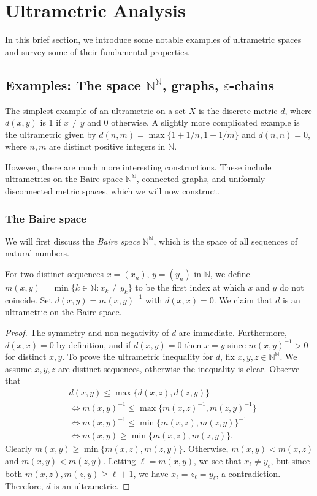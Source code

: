 \section{Ultrametric Analysis}
In this brief section, we introduce some notable examples of ultrametric spaces and survey some of their fundamental properties.
\subsection{Examples: The space \( \mathbb{N} ^{\mathbb{N} } \), graphs, \( \varepsilon \)-chains} The simplest example of an ultrametric on a set $X$ is the discrete metric $d$, where $d(x,y)$ is 1 if $x \neq y$ and 0 otherwise. A slightly more complicated example is the ultrametric given by \( d(n,m) = \max \{ 1 + 1/n , 1 + 1/m \} \) and \( d(n, n) = 0 \), where \( n , m  \) are distinct positive integers in \( \mathbb{N}  \).

However, there are much more interesting constructions. These include ultrametrics on the Baire space $\mathbb{N} ^{\mathbb{N} }$, connected graphs, and uniformly disconnected metric spaces, which we will now construct.

\subsubsection{The Baire space} We will first discuss the \emph{Baire space} \( \mathbb{N} ^{\mathbb{N} } \), which is the space of all sequences of natural numbers.

For two distinct sequences \( x = (x_{n}) \), \( y = (y_{n}) \) in \( \mathbb{N} \), we define \( m(x,y) = \min \{ k \in \mathbb{N} : x_{k} \neq y_{k} \} \) to be the first index at which \( x \) and \( y \) do not coincide. Set \( d(x,y) = m(x,y)^{-1} \) with \( d(x,x) = 0 \). We claim that \( d \) is an ultrametric on the Baire space.
\begin{proof}
The symmetry and non-negativity of \( d \) are immediate. Furthermore, \( d(x,x) = 0 \) by definition, and if \( d(x,y) = 0 \) then \( x = y \) since \( m(x,y)^{-1} > 0 \) for distinct \( x,y \). To prove the ultrametric inequality for \( d \), fix \( x,y,z \in \mathbb{N} ^{\mathbb{N} } \). We assume \( x,y,z \) are distinct sequences, otherwise the inequality is clear. Observe that
\begin{align*}
&d(x,y) \leq \max \{ d(x,z), d(z,y) \} \\
&\Leftrightarrow m(x,y)^{-1} \leq \max \{ m(x,z)^{-1} , m(z,y)^{-1} \} \\
&\Leftrightarrow m(x,y)^{-1} \leq \min \{ m(x,z), m(z,y) \} ^{-1} \\
&\Leftrightarrow m(x,y) \geq \min \{ m(x,z), m(z,y) \}.
\end{align*}
Clearly \( m(x,y) \geq \min \{ m(x,z), m(z,y) \} \). Otherwise, \( m(x,y) < m(x,z) \) and \( m(x,y) < m(z,y) \). Letting \( \ell = m(x,y) \), we see that \( x_{\ell} \neq y_{\ell} \), but since both \( m(x,z), m(z,y) \geq \ell + 1 \), we have \( x_{\ell} = z_{\ell} = y_{\ell} \), a contradiction. Therefore, \( d \) is an ultrametric.
\end{proof}
